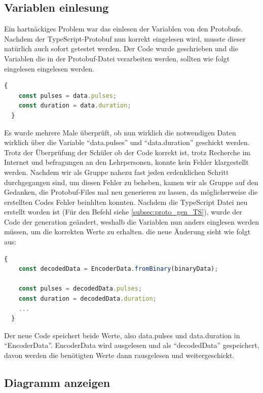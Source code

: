 \subsection{Variablen einlesung}
\label{subsubsec:problem_variablen_einlesen}

Ein hartnäckiges Problem war das einlesen der Variablen von den Protobufs. 
%
Nachdem der TypeScript-Protobuf nun korrekt eingelesen wird, 
musste dieser natürlich auch sofort getestet werden.
%
Der Code wurde geschrieben und die Variablen die in der Protobuf-Datei verarbeiten werden, 
sollten wie folgt eingelesen eingelesen werden.
\begin{lstlisting}[language=JavaScript, gobble=4]
  {
    const pulses = data.pulses;
    const duration = data.duration;
  }
\end{lstlisting}

Es wurde mehrere Male überprüft, ob nun wirklich die notwendigen Daten wirklich über die Variable 
``data.pulses'' und ``data.duration'' geschickt werden. 
%
Trotz der Überprüfung der Schüler ob der Code korrekt ist, 
trotz Recherche im Internet und befragungen an den Lehrpersonen, konnte kein Fehler klargestellt werden.
%
Nachdem wir als Gruppe nahezu fast jeden erdenklichen Schritt durchgegangen sind, um diesen Fehler zu beheben,
kamen wir als Gruppe auf den Gedanken, die Protobuf-Files mal neu generieren zu lassen, da möglicherweise 
%
die erstellten Codes Fehler beinhlten konnten. 
%
Nachdem die TypeScript Datei neu erstellt worden ist (Für den Befehl siehe \ref{subsec:proto_gen_TS}),
wurde der Code der generation geändert, weshalb die Variablen nun anders einglesen werden müssen,
um die korrekten Werte zu erhalten.
%
die neue Änderung sieht wie folgt aus:
\begin{lstlisting}[language=JavaScript, gobble=4]
  {
    const decodedData = EncoderData.fromBinary(binaryData);

    const pulses = decodedData.pulses;
    const duration = decodedData.duration;
    ...
  }
\end{lstlisting}
Der neue Code speichert beide Werte, also data.pulses und data.duration in ``EncoderData''.
EncoderData wird ausgelesen und als ``decodedData'' gespeichert, davon werden die benötigten Werte
dann rausgelesen und weitergeschickt.

\subsection{Diagramm anzeigen}
\label{subsubsec:problem_chart_anzeige}

